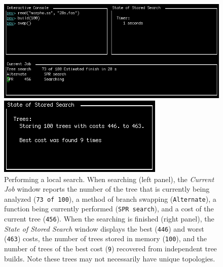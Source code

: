 \begin{figure}
\centering
\begin{minipage}[c]{0.49\textwidth}
   		\includegraphics[width=\textwidth]{figures/swap1.jpg}
\end{minipage}
\quad
\begin{minipage}[c]{0.453\textwidth}
	   	\includegraphics[width=\textwidth]{figures/swap2.jpg}
   	\end{minipage}
\caption{Performing a local search. When searching (left panel), the \emph{Current Job} window reports the number of the tree that is currently being analyzed (\texttt{73 of 100}), a method of branch swapping (\texttt{Alternate}), a function being currently performed (\texttt{SPR search}), and a cost of the current tree (\texttt{456}). When the searching is finished (right panel), the \emph{State of Stored Search} window displays the best (\texttt{446}) and worst (\texttt{463}) costs, the number of trees stored in memory (\texttt{100}), and the number of trees of the best cost (\texttt{9}) recovered from independent tree builds. Note these trees may not necessarily have unique topologies.} 
\label{fig:swapping}
\end{figure}

